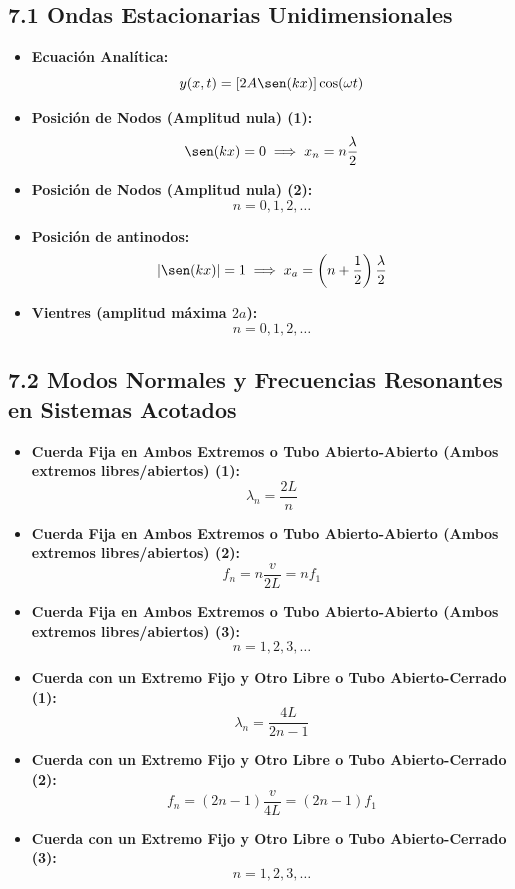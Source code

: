\documentclass[11pt,a4paper]{article}
\begin{document}
\subsection*{7.1 Ondas Estacionarias Unidimensionales}

\begin{itemize}
  \item \textbf{Ecuación Analítica:}
  \[
    y(x, t) = [2A \sen(kx)] \cos(\omega t)
  \]
  \item \textbf{Posición de Nodos (Amplitud nula) (1):}
  \[
    \sen(kx) = 0 \implies x_n = n \frac{\lambda}{2}
  \]
  \item \textbf{Posición de Nodos (Amplitud nula) (2):}
  \[
    n = 0, 1, 2, \dots
  \]
  \item \textbf{Posición de antinodos:}
  \[
    |\sen(kx)| = 1 \implies x_a = \left( n + \frac{1}{2} \right) \frac{\lambda}{2}
  \]
  \item \textbf{Vientres (amplitud máxima $2a$):}
  \[
    n = 0, 1, 2, \dots
  \]
\end{itemize}

\subsection*{7.2 Modos Normales y Frecuencias Resonantes en Sistemas Acotados}

\begin{itemize}
  \item \textbf{Cuerda Fija en Ambos Extremos o Tubo Abierto-Abierto (Ambos extremos libres/abiertos) (1):}
  \[
    \lambda_n = \frac{2L}{n}
  \]
  \item \textbf{Cuerda Fija en Ambos Extremos o Tubo Abierto-Abierto (Ambos extremos libres/abiertos) (2):}
  \[
    f_n = n \frac{v}{2L} = n f_1
  \]
  \item \textbf{Cuerda Fija en Ambos Extremos o Tubo Abierto-Abierto (Ambos extremos libres/abiertos) (3):}
  \[
    n = 1, 2, 3, \dots
  \]
  \item \textbf{Cuerda con un Extremo Fijo y Otro Libre o Tubo Abierto-Cerrado (1):}
  \[
    \lambda_n = \frac{4L}{2n - 1}
  \]
  \item \textbf{Cuerda con un Extremo Fijo y Otro Libre o Tubo Abierto-Cerrado (2):}
  \[
    f_n = (2n - 1) \frac{v}{4L} = (2n - 1) f_1
  \]
  \item \textbf{Cuerda con un Extremo Fijo y Otro Libre o Tubo Abierto-Cerrado (3):}
  \[
    n = 1, 2, 3, \dots
  \]
\end{itemize}
\end{document}
